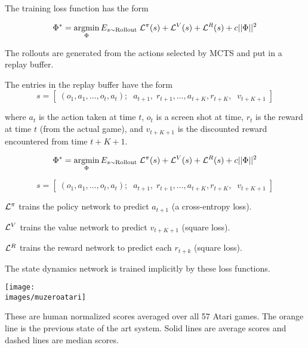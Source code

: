 {

{\huge
The training loss function has the form

$$\Phi^* = \operatorname*{argmin}_\Phi E_{s \sim \mathrm{Rollout}}\;{\cal L}^\pi(s) + {\cal L}^V(s) +{\cal L}^R(s) + c||\Phi||^2$$

\vfill
The rollouts are generated from the actions selected by MCTS and put in a replay buffer.

\vfill
The entries in the replay buffer have the form
$$s = \left[\;(o_1,a_1,\ldots,o_t,a_t);\;\;a_{t+1},\;r_{t+1},\ldots,a_{t+K},r_{t+K},\;\;v_{t+K+1}\;\right]$$

\vfill
where $a_t$ is the action taken at time $t$, $o_t$ is a screen shot at time, $r_t$ is the reward at time $t$ (from the actual game), and
$v_{t+K+1}$ is the discounted reward encountered from time $t+K+1$.
}

{\huge
$$\Phi^* = \operatorname*{argmin}_\Phi E_{s \sim \mathrm{Rollout}}\;{\cal L}^\pi(s) + {\cal L}^V(s) +{\cal L}^R(s) + c||\Phi||^2$$

$$s  = \left[\;(o_1,a_1,\ldots,o_t,a_t);\;\;a_{t+1},\;r_{t+1},\ldots,a_{t+K},r_{t+K},\;\;v_{t+K+1}\;\right]$$
  
\vfill
${\cal L}^\pi$ trains the policy network to predict $a_{t+1}$ (a cross-entropy loss).

\vfill
${\cal L}^V$ trains the value network to predict $v_{t+K+1}$ (square loss).

\vfill
${\cal L}^R$ trains the reward network to predict each $r_{t+k}$ (square loss).

\vfill
The state dynamics network is trained implicitly by these loss functions.
}



\centerline{\texttt{[image: \\images/muzeroatari]}}

{\huge
  These are human normalized scores averaged over all 57 Atari games.  The orange line is the previous state of the art system.  Solid lines are average scores and dashed lines are median scores.
}


}



